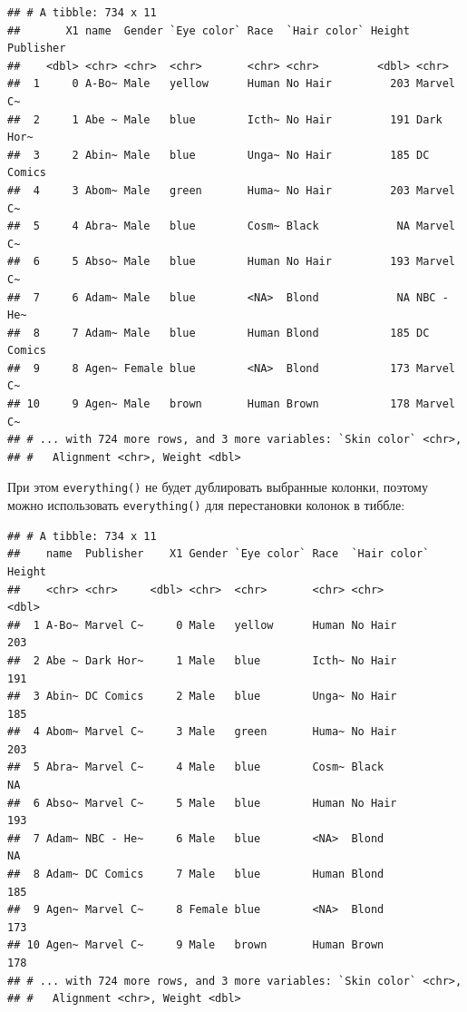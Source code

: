 \documentclass[
]{book}
\newenvironment{Shaded}{\begin{snugshade}}{\end{snugshade}}
\newcommand{\KeywordTok}[1]{\textcolor[rgb]{0.13,0.29,0.53}{\textbf{#1}}}
\newcommand{\NormalTok}[1]{#1}
\newcommand{\OperatorTok}[1]{\textcolor[rgb]{0.81,0.36,0.00}{\textbf{#1}}}
\newcommand{\StringTok}[1]{\textcolor[rgb]{0.31,0.60,0.02}{#1}}
\begin{document}
\begin{verbatim}
## # A tibble: 734 x 11
##       X1 name  Gender `Eye color` Race  `Hair color` Height Publisher
##    <dbl> <chr> <chr>  <chr>       <chr> <chr>         <dbl> <chr>    
##  1     0 A-Bo~ Male   yellow      Human No Hair         203 Marvel C~
##  2     1 Abe ~ Male   blue        Icth~ No Hair         191 Dark Hor~
##  3     2 Abin~ Male   blue        Unga~ No Hair         185 DC Comics
##  4     3 Abom~ Male   green       Huma~ No Hair         203 Marvel C~
##  5     4 Abra~ Male   blue        Cosm~ Black            NA Marvel C~
##  6     5 Abso~ Male   blue        Human No Hair         193 Marvel C~
##  7     6 Adam~ Male   blue        <NA>  Blond            NA NBC - He~
##  8     7 Adam~ Male   blue        Human Blond           185 DC Comics
##  9     8 Agen~ Female blue        <NA>  Blond           173 Marvel C~
## 10     9 Agen~ Male   brown       Human Brown           178 Marvel C~
## # ... with 724 more rows, and 3 more variables: `Skin color` <chr>,
## #   Alignment <chr>, Weight <dbl>
\end{verbatim}

При этом \texttt{everything()} не будет дублировать выбранные колонки, поэтому можно использовать \texttt{everything()} для перестановки колонок в тиббле:

\begin{Shaded}
\end{Shaded}

\begin{verbatim}
## # A tibble: 734 x 11
##    name  Publisher    X1 Gender `Eye color` Race  `Hair color` Height
##    <chr> <chr>     <dbl> <chr>  <chr>       <chr> <chr>         <dbl>
##  1 A-Bo~ Marvel C~     0 Male   yellow      Human No Hair         203
##  2 Abe ~ Dark Hor~     1 Male   blue        Icth~ No Hair         191
##  3 Abin~ DC Comics     2 Male   blue        Unga~ No Hair         185
##  4 Abom~ Marvel C~     3 Male   green       Huma~ No Hair         203
##  5 Abra~ Marvel C~     4 Male   blue        Cosm~ Black            NA
##  6 Abso~ Marvel C~     5 Male   blue        Human No Hair         193
##  7 Adam~ NBC - He~     6 Male   blue        <NA>  Blond            NA
##  8 Adam~ DC Comics     7 Male   blue        Human Blond           185
##  9 Agen~ Marvel C~     8 Female blue        <NA>  Blond           173
## 10 Agen~ Marvel C~     9 Male   brown       Human Brown           178
## # ... with 724 more rows, and 3 more variables: `Skin color` <chr>,
## #   Alignment <chr>, Weight <dbl>
\end{verbatim}
\end{document}
